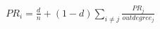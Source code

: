 \documentclass[10pt]{article}
\begin{document}
\begin{align*}PR_{i} = \frac{d}{n} + (1-d) \sum_{i \neq j} \frac{PR_j}{outdegree_j}\end{align*}
\end{document}
